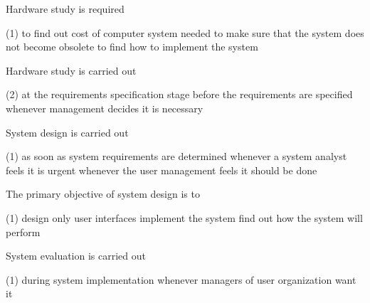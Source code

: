 \documentclass{article}
\begin{document}
\begin{questions}
    \newpage
    \begin{exercise}
        Hardware study is required
        \begin{choice}(1)
            \choice to find out cost of computer system needed
            \choice {}
            \choice to make sure that the system does not become obsolete
            \choice to find how to implement the system
        \end{choice}
    \end{exercise}
    \begin{exercise}
        Hardware study is carried out
        \begin{choice}(2)
            \choice {}
            \choice at the requirements specification stage
            \choice before the requirements are specified
            \choice whenever management decides it is necessary
        \end{choice}
    \end{exercise}
    \begin{exercise}
        System design is carried out
        \begin{choice}(1)
            \choice as soon as system requirements are determined
            \choice whenever a system analyst feels it is urgent
            \choice {}
            \choice whenever the user management feels it should be done
        \end{choice}
    \end{exercise}
    \begin{exercise}
        The primary objective of system design is to
        \begin{choice}(1)
            \choice {}
            \choice design only user interfaces
            \choice implement the system
            \choice find out how the system will perform
        \end{choice}
    \end{exercise}
    \begin{exercise}
        System evaluation is carried out
        \begin{choice}(1)
            \choice {}
            \choice during system implementation
            \choice whenever managers of user organization want it

\end{choice}
\end{exercise}
\end{questions}
\end{document}
